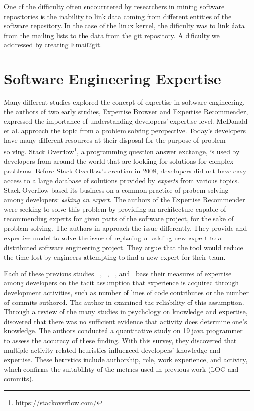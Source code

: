 One of the difficulty often encourntered by researchers in mining software repositories is the inability to link data coming from different entities of the software repository. In the case of the linux kernel, the dificulty was to link data from the mailing lists to the data from the git repository. A dificulty we addressed by creating Email2git.



\section{Software Engineering Expertise}
\label{sec:expertise_models}

Many different studies explored the concept of expertise in software engineering. the authors of two early studies, Expertise Browser \citep{mockus02} and Expertise Recommender\citep{McDonald}, expressed the importance of understanding developers' expertise level. McDonald et al. approach the topic from a problem solving percpective. Today's developers have many different resources at their disposal for the purpose of problem solving. Stack Overflow\footnote{\url{https://stackoverflow.com/}}, a programming question answer exchange, is used by developers from around the world that are lookiing for solutions for complex problems. Before Stack Overflow's creation in 2008, developers did not have easy access to a large database of solutions provided by \textit{experts} from various topics. Stack Overflow based its business on a common practice of probem solving among developers: \textit{asking an expert}. The authors of the Expertise Recommender were seeking to solve this problem by providing an architecture capable of recommending experts for given parts of the software project, for the sake of problem solving. The authors in \citep{mockus02} approach the issue differently. They provide and expertise model to solve the issue of replacing or adding new expert to a distributed software engineering project. They argue that the tool would reduce the time lost by engineers attempting to find a new expert for their team.  


Each of these previous studies ~\citep{Bhattacharya}, ~\citep{mockus02}, ~\citep{McDonald}, and~\citep{Fritz-2007} base their measures of expertise among developers on the tacit assumption that experience is acquired through development activities, such as number of lines of code contributes or the number of commits authored. The author in \citep{Fritz-2007} examined the reliability of this assumption. Through a review of the many studies in psychology on knowledge and expertise, \citep{Fritz-2007} disovered that there was no sufficient evidence that activity does determine one's knowledge. The authors conducted a quantitative study on 19 java programmer to assess the accuracy of these finding. With this survey, they discovered that multiple activity related heuristics influenced developers' knowledge and expertise. These heurstics include authorship, role, work experience, and activity, which confirms the suitablility of the metrics used in previous work (LOC and commits).


